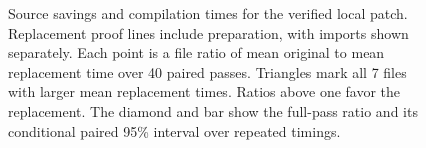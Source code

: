 \begin{figure}[htbp]
\centering

\caption{Source savings and compilation times for the verified local patch.
Replacement proof lines include preparation, with imports shown separately.
Each point is a file ratio of mean original to mean replacement time over 40 paired passes.
Triangles mark all 7 files with larger mean replacement times.
Ratios above one favor the replacement.
The diamond and bar show the full-pass ratio and its conditional paired 95\% interval over repeated timings.}
\label{fig:evaluation}
\end{figure}
